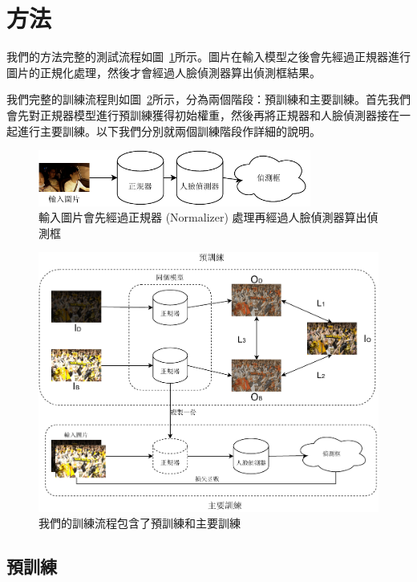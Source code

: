 \section{方法}

我們的方法完整的測試流程如圖~\ref{fig:test_flow}所示。圖片在輸入模型之後會先經過正規器進行圖片的正規化處理，然後才會經過人臉偵測器算出偵測框結果。

我們完整的訓練流程則如圖~\ref{fig:train_flow}所示，分為兩個階段：預訓練和主要訓練。首先我們會先對正規器模型進行預訓練獲得初始權重，然後再將正規器和人臉偵測器接在一起進行主要訓練。以下我們分別就兩個訓練階段作詳細的說明。

\begin{figure}[htb]
\centering
\includegraphics[width=0.8\textwidth]{figures/test_flow}
\caption[測試時從輸入圖片到獲得偵測結果的流程]{輸入圖片會先經過正規器 (Normalizer) 處理再經過人臉偵測器算出偵測框}
\label{fig:test_flow}
\end{figure}

\begin{figure}[htb]
\centering
\includegraphics[width=1\textwidth]{figures/train_flow}
\caption[完整的訓練流程]{我們的訓練流程包含了預訓練和主要訓練}
\label{fig:train_flow}
\end{figure}

\subsection{預訓練}

